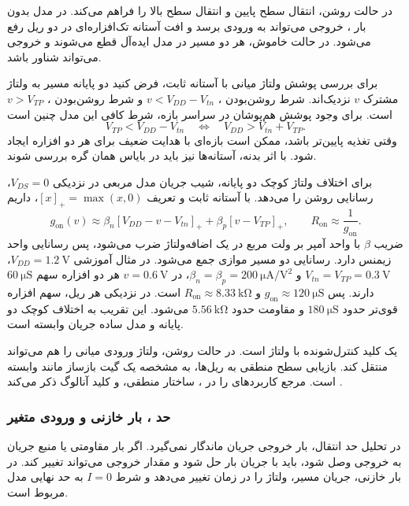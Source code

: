 در حالت روشن،  انتقال سطح پایین و 
انتقال سطح بالا را فراهم می‌کند. در مدل بدون بار ،
خروجی می‌تواند به ورودی برسد و افت آستانه تک‌افزاره‌ای در
دو ریل رفع می‌شود. در حالت خاموش، هر دو مسیر در مدل ایده‌آل
قطع می‌شوند و خروجی می‌تواند شناور باشد.

برای بررسی پوشش ولتاژ میانی با آستانه ثابت، فرض کنید دو
پایانه مسیر به ولتاژ مشترک \(v\) نزدیک‌اند. شرط روشن‌بودن
، \(v<V_{DD}-V_{tn}\) و شرط روشن‌بودن
، \(v>V_{TP}\) است. برای وجود پوشش هم‌پوشان
در سراسر بازه، شرط کافی این مدل چنین است
\begin{equation}
 V_{TP}<V_{DD}-V_{tn}
 \quad\Longleftrightarrow\quad V_{DD}>V_{tn}+V_{TP}.
 \label{eq:pass-tg-overlap}
\end{equation}
وقتی تغذیه پایین‌تر باشد، ممکن است بازه‌ای با هدایت ضعیف
برای هر دو افزاره ایجاد شود. با اثر بدنه، آستانه‌ها نیز
باید در بایاس همان گره بررسی شوند.

برای اختلاف ولتاژ کوچک دو پایانه، شیب جریان مدل مربعی
در نزدیکی \(V_{DS}=0\)، رسانایی روشن را می‌دهد. با
آستانه ثابت و تعریف \([x]_+=\max(x,0)\)، داریم
\begin{equation}
 g_{\mathrm{on}}(v)\approx
 \beta_n[V_{DD}-v-V_{tn}]_+
 +\beta_p[v-V_{TP}]_+,
 \qquad R_{\mathrm{on}}\approx\frac{1}{g_{\mathrm{on}}}.
 \label{eq:pass-tg-conductance}
\end{equation}
ضریب \(\beta\) با واحد آمپر بر ولت مربع در یک اضافه‌ولتاژ
ضرب می‌شود، پس رسانایی واحد زیمنس دارد. رسانایی دو مسیر
موازی جمع می‌شود. در مثال آموزشی
\(V_{DD}=\qty{1.2}{\volt}\)،
\(V_{tn}=V_{TP}=\qty{0.3}{\volt}\) و
\(\beta_n=\beta_p=\qty{200}{\micro\ampere\per\volt\squared}\)،
در \(v=\qty{0.6}{\volt}\) هر دو افزاره سهم
\(\qty{60}{\micro\siemens}\) دارند.
پس \(g_{\mathrm{on}}\approx\qty{120}{\micro\siemens}\) و
\(R_{\mathrm{on}}\approx\qty{8.33}{\kilo\ohm}\) است.
در نزدیکی هر ریل، سهم افزاره قوی‌تر حدود
\(\qty{180}{\micro\siemens}\) و مقاومت حدود
\(\qty{5.56}{\kilo\ohm}\) می‌شود.
این تقریب به اختلاف کوچک دو پایانه و مدل ساده جریان وابسته است.

 یک کلید کنترل‌شونده با ولتاژ است. در حالت روشن،
ولتاژ ورودی میانی را هم می‌تواند منتقل کند. بازیابی سطح
منطقی به ریل‌ها، به مشخصه یک گیت بازساز مانند
 وابسته است. مرجع کاربردهای  را در
، ساختار منطقی،  و کلید آنالوگ
ذکر می‌کند \cite[صفحه ۹۳]{weste}.

\subsubsection{حد ، بار خازنی و ورودی متغیر}
\label{sec:pass-dc-time}
در تحلیل حد انتقال، بار خروجی جریان ماندگار نمی‌گیرد.
اگر بار مقاومتی یا منبع جریان به خروجی وصل شود، باید
 با جریان بار حل شود و مقدار خروجی می‌تواند تغییر
کند. در بار خازنی، جریان مسیر، ولتاژ را در زمان تغییر می‌دهد
و شرط \(I=0\) به حد نهایی مدل مربوط است.

